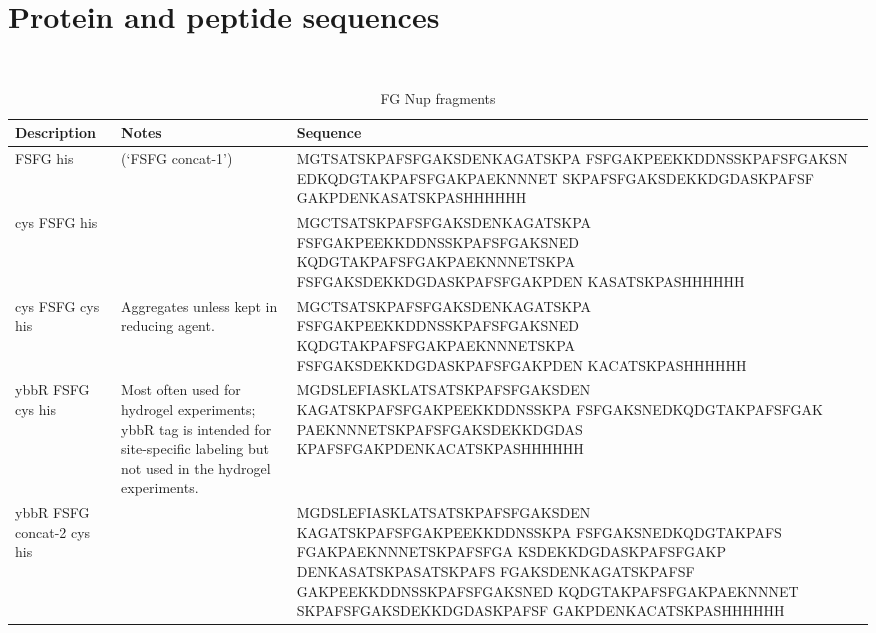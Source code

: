 \chapter{Protein and peptide sequences}~\label{appx:sequences}
\begin{table}[b!]
\centering
  \caption[FG Nup sequences]{FG Nup fragments}
    \label{table:Nups}
    \begin{tabular}{p{3.5cm}p{4cm}p{8cm}}
      Description & Notes &Sequence \\
      \hline
      FSFG his & (`FSFG concat-1') & MGTSATSKPAFSFGAKSDENKAGATSKPA
FSFGAKPEEKKDDNSSKPAFSFGAKSN
EDKQDGTAKPAFSFGAKPAEKNNNET
SKPAFSFGAKSDEKKDGDASKPAFSF
GAKPDENKASATSKPASHHHHHH\\
      \hline
	cys FSFG his & & MGCTSATSKPAFSFGAKSDENKAGATSKPA
FSFGAKPEEKKDDNSSKPAFSFGAKSNED
KQDGTAKPAFSFGAKPAEKNNNETSKPA
FSFGAKSDEKKDGDASKPAFSFGAKPDEN
KASATSKPASHHHHHH\\
      \hline
	cys FSFG cys his& Aggregates unless kept in reducing agent. & MGCTSATSKPAFSFGAKSDENKAGATSKPA
FSFGAKPEEKKDDNSSKPAFSFGAKSNED
KQDGTAKPAFSFGAKPAEKNNNETSKPA
FSFGAKSDEKKDGDASKPAFSFGAKPDEN
KACATSKPASHHHHHH \\
      \hline
	ybbR FSFG cys his & Most often used for hydrogel experiments; ybbR tag is intended for site-specific labeling but not used in the hydrogel experiments.& MGDSLEFIASKLATSATSKPAFSFGAKSDEN
KAGATSKPAFSFGAKPEEKKDDNSSKPA
FSFGAKSNEDKQDGTAKPAFSFGAK
PAEKNNNETSKPAFSFGAKSDEKKDGDAS
KPAFSFGAKPDENKACATSKPASHHHHHH\\
\hline
	ybbR FSFG concat-2 cys his& & MGDSLEFIASKLATSATSKPAFSFGAKSDEN
KAGATSKPAFSFGAKPEEKKDDNSSKPA
FSFGAKSNEDKQDGTAKPAFS
FGAKPAEKNNNETSKPAFSFGA
KSDEKKDGDASKPAFSFGAKP
DENKASATSKPASATSKPAFS
FGAKSDENKAGATSKPAFSF
GAKPEEKKDDNSSKPAFSFGAKSNED
KQDGTAKPAFSFGAKPAEKNNNET
SKPAFSFGAKSDEKKDGDASKPAFSF
GAKPDENKACATSKPASHHHHHH\\
\hline
    \end{tabular}
\end{table}
\newpage
